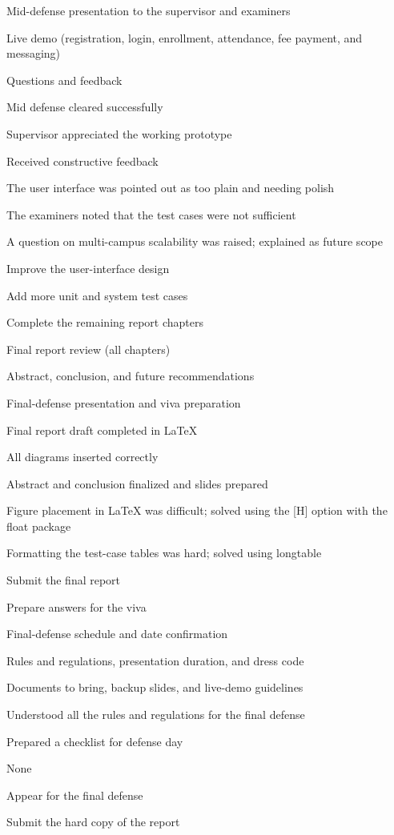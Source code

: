 \documentclass[12pt,a4paper]{report}
\begin{document}
{\item Mid-defense presentation to the supervisor and examiners
 \item Live demo (registration, login, enrollment, attendance, fee payment, and messaging)
 \item Questions and feedback}
{\item Mid defense cleared successfully
 \item Supervisor appreciated the working prototype
 \item Received constructive feedback}
{\item The user interface was pointed out as too plain and needing polish
 \item The examiners noted that the test cases were not sufficient
 \item A question on multi-campus scalability was raised; explained as future scope}
{\item Improve the user-interface design
 \item Add more unit and system test cases
 \item Complete the remaining report chapters}

{\item Final report review (all chapters)
 \item Abstract, conclusion, and future recommendations
 \item Final-defense presentation and viva preparation}
{\item Final report draft completed in LaTeX
 \item All diagrams inserted correctly
 \item Abstract and conclusion finalized and slides prepared}
{\item Figure placement in LaTeX was difficult; solved using the [H] option with the float package
 \item Formatting the test-case tables was hard; solved using longtable}
{\item Submit the final report
 \item Prepare answers for the viva}

{\item Final-defense schedule and date confirmation
 \item Rules and regulations, presentation duration, and dress code
 \item Documents to bring, backup slides, and live-demo guidelines}
{\item Understood all the rules and regulations for the final defense
 \item Prepared a checklist for defense day}
{\item None}
{\item Appear for the final defense
 \item Submit the hard copy of the report}
\end{document}
